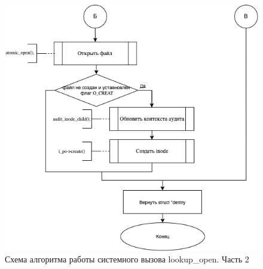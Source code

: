 \documentclass[12pt]{report}
\begin{document}
\begin{figure}[h!]
	\centering
	\includegraphics[scale=0.7]{lookups_open2.png}
	\caption{Схема алгоритма работы системного вызова lookup\_open. Часть 2}
	\label{png:testing:result}
\end{figure}
\end{document}
